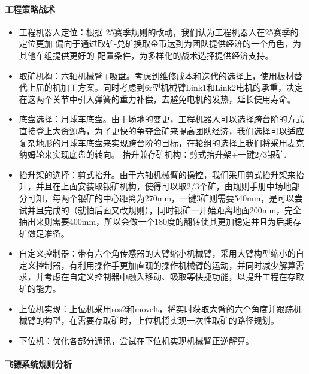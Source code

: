         \paragraph{工程策略战术}

    
            \begin{itemize}
                \item 工程机器人定位：根据 25赛季规则的改动，我们认为工程机器人在25赛季的定位更加 偏向于通过取矿-兑矿换取金币达到为团队提供经济的一个角色，为其他车组提供更好的 配置条件，为多样化的战术选择提供经济支持。
                \item 取矿机构：六轴机械臂+吸盘。考虑到维修成本和迭代的选择上，使用板材替代上届的机加工方案。同时考虑到6r型机械臂Link1和Link2电机的承重，决定在这两个关节中引入弹簧的重力补偿，去避免电机的发热，延长使用寿命。
                \item 底盘选择：月球车底盘。由于场地的变更，工程机器人可以选择跨台阶的方式直接登上大资源岛，为了更快的争夺金矿来提高团队经济，我们选择可以适应复杂地形的月球车底盘来实现跨台阶的目标，在轮组的选择上我们将采用麦克纳姆轮来实现底盘的转向。 抬升兼存矿机构：剪式抬升架+一键2/3银矿.
                \item 抬升架的选择：剪式抬升。由于六轴机械臂的操控，我们采用剪式抬升架来抬升，并且在上面安装取银矿机构，使得可以取2/3个矿，由规则手册中场地部分可知，每两个银矿的中心距离为270mm，一键3矿则需要540mm，是可以尝试并且完成的（就怕后面又改规则），同时银矿一开始距离地面200mm，完全抽出来则需要400mm，所以会做一个180度的翻转使其更加稳定并且为后期存矿做足准备。
                \item 自定义控制器：带有六个角传感器的大臂缩小机械臂，采用大臂构型缩小的自定义控制器，有利用操作手更加直观的操作机械臂的运动，并同时减少解算需求，并考虑在自定义控制器中融入移动、吸取等快捷功能，以提升工程在存取矿的能力。
                \item 上位机实现：上位机采用ros2和movelt，将实时获取大臂的六个角度并跟踪机械臂的构型，在需要存取矿时，上位机将实现一次性取矿的路径规划。
                \item 下位机：优化各部分通讯，尝试在下位机实现机械臂正逆解算。
            \end{itemize}

        \paragraph{飞镖系统规则分析}


